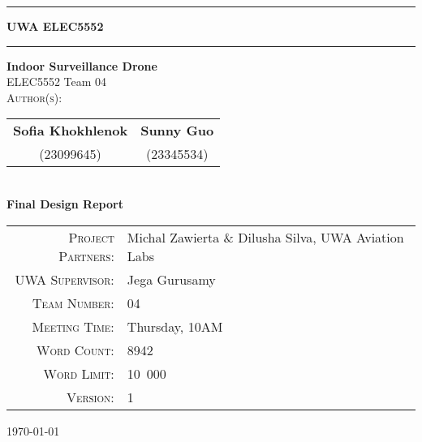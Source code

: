 \begin{titlepage}

\noindent\rule{\textwidth}{0.5pt}
\begin{flushright}
    \textbf{UWA ELEC5552}
\end{flushright}
\rule{\textwidth}{0.5pt}

\vspace{2cm}

\thispagestyle{empty}

\begin{center}
    {\Huge \textbf{Indoor Surveillance Drone}} \\[0.75cm]
    {\Large ELEC5552 Team 04} \\[1.5cm]

    \textsc{Author(s):} \\[0.5cm]

    \begin{tabular}{@{}c@{\hskip 1cm}c@{}}
        \textbf{Sofia Khokhlenok} & \textbf{Sunny Guo} \\[0.2cm]
        (23099645) & (23345534) \\
    \end{tabular} \\[1.5cm]

    {\Large \textbf{Final Design Report}} \\[0.5cm]
\end{center}

\vspace{1.5cm}

\begin{center}
\begin{tabular}{rl}
\textsc{Project Partners:} & Michal Zawierta \& Dilusha Silva, UWA Aviation Labs \\
\textsc{UWA Supervisor:} & Jega Gurusamy \\
\textsc{Team Number:} & 04 \\
\textsc{Meeting Time:} & Thursday, 10AM \\
\textsc{Word Count:} & 8942 \\
\textsc{Word Limit:} & 10~000 \\
\textsc{Version:} & 1 \\
\end{tabular}
\end{center}

\vfill

\begin{center}
    \large \today
\end{center}

\end{titlepage}
